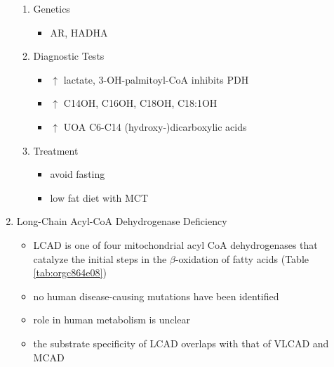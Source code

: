 \documentclass{scrartcl}
\begin{document}
\begin{enumerate}
\begin{enumerate}
\item Genetics
\label{sec:orge409f0f}
\begin{itemize}
\item AR, HADHA
\end{itemize}

\item Diagnostic Tests
\label{sec:org4dac1fc}
\begin{itemize}
\item \(\uparrow\) lactate, 3-OH-palmitoyl-CoA inhibits PDH
\item \(\uparrow\) C14OH, C16OH, C18OH, C18:1OH
\item \(\uparrow\) UOA C6-C14 (hydroxy-)dicarboxylic acids
\end{itemize}

\item Treatment
\label{sec:org081cea3}
\begin{itemize}
\item avoid fasting
\item low fat diet with MCT
\end{itemize}
\end{enumerate}
\item Long-Chain Acyl-CoA Dehydrogenase Deficiency
\label{sec:orga1e6bc4}
\begin{itemize}
\item LCAD is one of four mitochondrial acyl CoA dehydrogenases that
catalyze the initial steps in the \(\beta\)-oxidation of fatty acids
(Table \ref{tab:orgc864e08})
\item no human disease-causing mutations have been identified
\item role  in  human  metabolism  is unclear
\item the substrate specificity of LCAD overlaps with that of
VLCAD and MCAD
\end{itemize}


\end{enumerate}
\end{document}
